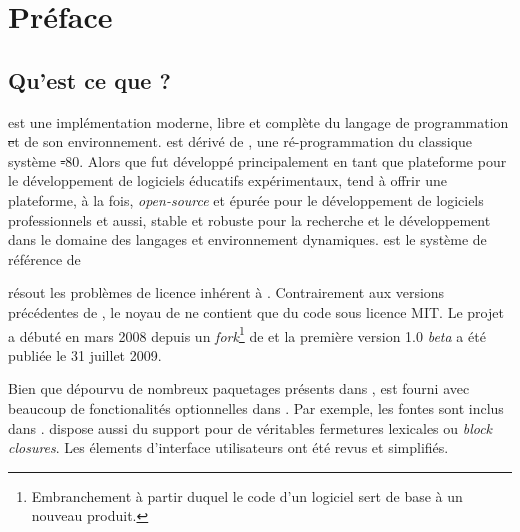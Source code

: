 \documentclass[a4paper,10pt,twoside]{book}
\begin{document}
    \sloppy
    \frontmatter
\fi
\renewcommand{\nnbb}[2]{} %
\sloppy
\chapter{Préface}

\section*{Qu'est ce que \pharo?}

\pharo est une implémentation moderne, libre et complète du
langage de programmation \st et de son environnement. \pharo est
dérivé de \squeak\cite{Inga97a}, une ré-programmation du classique
système \st-80. Alors que \squeak fut développé principalement en tant que
plateforme pour le développement de logiciels éducatifs
expérimentaux, \pharo tend à offrir une plateforme,
à la fois, \emph{open-source} et épurée pour le développement de
logiciels professionnels et aussi, stable et robuste pour la recherche 
et le développement dans le domaine des langages et environnement dynamiques. 
\pharo est le système de référence de  %

\pharo résout les problèmes de licence inhérent à \squeak. 
Contrairement aux versions précédentes de \squeak, le noyau
de \pharo ne contient que du code sous licence MIT. Le projet \pharo
a débuté en mars 2008 depuis un \emph{fork}\footnote{Embranchement à
partir duquel le code d'un logiciel sert de base à un nouveau produit.}
de  et la première version 1.0 \emph{beta} a été publiée le
31 juillet 2009. %

Bien que dépourvu de nombreux paquetages présents dans \squeak, \pharo
est fourni avec beaucoup de fonctionalités optionnelles dans \squeak.
Par exemple, les fontes \truetype sont inclus dans \pharo. \pharo
dispose aussi du support pour de véritables fermetures lexicales ou
\emph{block closures}. Les élements d'interface utilisateurs ont été
revus et simplifiés. %
\end{document}
